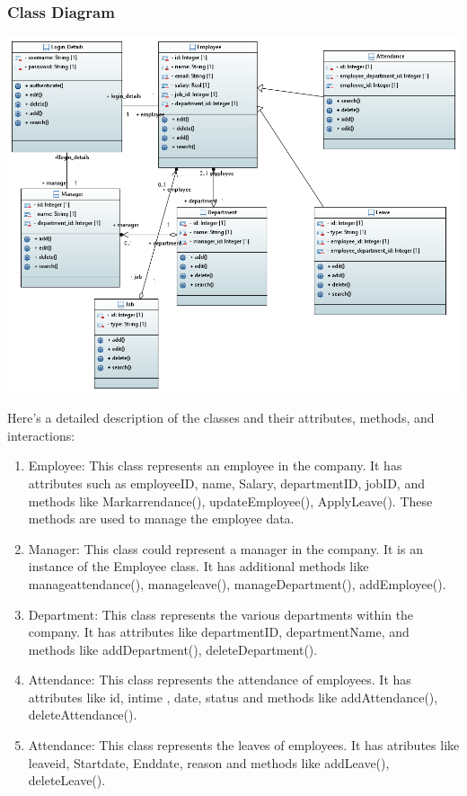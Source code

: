 \documentclass[a4paper, 12pt]{article}
\begin{document}
\subsubsection{Class Diagram}
\begin{center}
\includegraphics[width=1\textwidth]{Attendance_Management_System_Class_Diagram.PNG}\par
\end{center}
Here’s a detailed description of the classes and their attributes, methods, and interactions:
\begin{enumerate}
    \item Employee: This class represents an employee in the company. It has attributes such as employeeID, name, Salary, departmentID, jobID, and methods like Markarrendance(), updateEmployee(), ApplyLeave(). These methods are used to manage the employee data.
    \item Manager: This class could represent a manager in the company. It is an instance of the Employee class. It has additional methods like manageattendance(), manageleave(), manageDepartment(), addEmployee().
    \item Department: This class represents the various departments within the company. It has attributes like departmentID, departmentName, and methods like addDepartment(), deleteDepartment().
    \item Attendance: This class represents the attendance of employees. It has attributes like id, intime , date, status and methods like addAttendance(), deleteAttendance().
    \item Attendance: This class represents the leaves of employees. It has atributes like leaveid, Startdate, Enddate, reason and methods like addLeave(), deleteLeave().
\end{enumerate}
\end{document}
